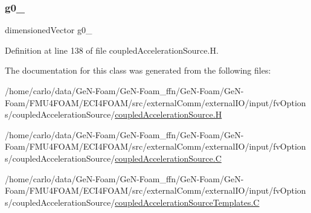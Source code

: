 \subsubsection{\texorpdfstring{g0\+\_\+}{g0\_}}
{\footnotesize\ttfamily dimensioned\+Vector g0\+\_\+\hspace{0.3cm}{\ttfamily [protected]}}



Definition at line 138 of file coupled\+Acceleration\+Source.\+H.



The documentation for this class was generated from the following files\+:\begin{DoxyCompactItemize}
\item 
/home/carlo/data/\+Ge\+N-\/\+Foam/\+Ge\+N-\/\+Foam\+\_\+ffn/\+Ge\+N-\/\+Foam/\+Ge\+N-\/\+Foam/\+F\+M\+U4\+F\+O\+A\+M/\+E\+C\+I4\+F\+O\+A\+M/src/external\+Comm/external\+I\+O/input/fv\+Options/coupled\+Acceleration\+Source/\hyperlink{coupledAccelerationSource_8H}{coupled\+Acceleration\+Source.\+H}\item 
/home/carlo/data/\+Ge\+N-\/\+Foam/\+Ge\+N-\/\+Foam\+\_\+ffn/\+Ge\+N-\/\+Foam/\+Ge\+N-\/\+Foam/\+F\+M\+U4\+F\+O\+A\+M/\+E\+C\+I4\+F\+O\+A\+M/src/external\+Comm/external\+I\+O/input/fv\+Options/coupled\+Acceleration\+Source/\hyperlink{coupledAccelerationSource_8C}{coupled\+Acceleration\+Source.\+C}\item 
/home/carlo/data/\+Ge\+N-\/\+Foam/\+Ge\+N-\/\+Foam\+\_\+ffn/\+Ge\+N-\/\+Foam/\+Ge\+N-\/\+Foam/\+F\+M\+U4\+F\+O\+A\+M/\+E\+C\+I4\+F\+O\+A\+M/src/external\+Comm/external\+I\+O/input/fv\+Options/coupled\+Acceleration\+Source/\hyperlink{coupledAccelerationSourceTemplates_8C}{coupled\+Acceleration\+Source\+Templates.\+C}\end{DoxyCompactItemize}
